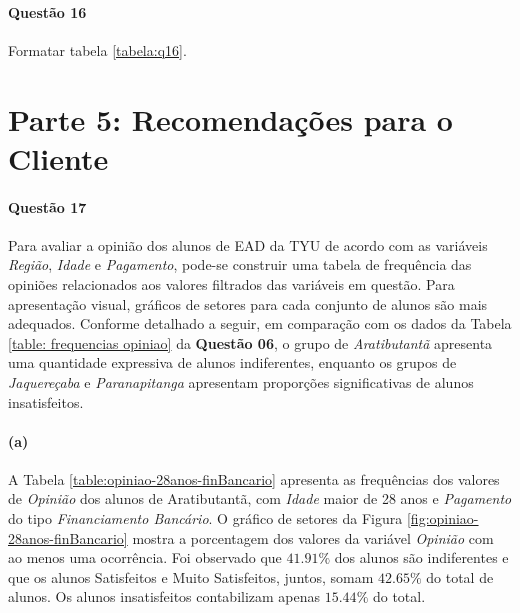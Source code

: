 \documentclass[10pt,a4paper,oneside]{article}
\newcommand{\arat}{Aratibutantã\xspace}
\newcommand{\jaqu}{Jaquereçaba\xspace}
\newcommand{\para}{Paranapitanga\xspace}
\newcommand{\eng}{Engenharia e Produção\xspace}
\newcommand{\jur}{Jurídica e Contábil\xspace}
\begin{document}






\FloatBarrier
\paragraph{Questão 16}
Formatar tabela \ref{tabela:q16}.


\section*{Parte 5: Recomendações para o Cliente}

\FloatBarrier
\paragraph{Questão 17}

Para avaliar a opinião dos alunos de EAD da TYU de acordo com as variáveis \textit{Região}, \textit{Idade} e \textit{Pagamento}, pode-se construir uma tabela de frequência das opiniões relacionados aos valores filtrados das variáveis em questão. Para apresentação visual, gráficos de setores para cada conjunto de alunos são mais adequados. Conforme detalhado a seguir, em comparação com os dados da Tabela \ref{table: frequencias opiniao} da \textbf{Questão 06}, o grupo de \textit{\arat} apresenta uma quantidade expressiva de alunos indiferentes, enquanto os grupos de \textit{\jaqu} e \textit{\para} apresentam proporções significativas de alunos insatisfeitos.

\paragraph{(a)} A Tabela \ref{table:opiniao-28anos-finBancario} apresenta as frequências dos valores de \textit{Opinião} dos alunos de \arat, com \textit{Idade} maior de 28 anos e \textit{Pagamento} do tipo \textit{Financiamento Bancário}. O gráfico de setores da Figura \ref{fig:opiniao-28anos-finBancario} mostra a porcentagem dos valores da variável \textit{Opinião} com ao menos uma ocorrência.
Foi observado que $41.91\%$ dos alunos são indiferentes e que os alunos Satisfeitos e Muito Satisfeitos, juntos, somam $42.65\%$ do total de alunos. Os alunos insatisfeitos contabilizam apenas $15.44\%$ do total.
\end{document}
